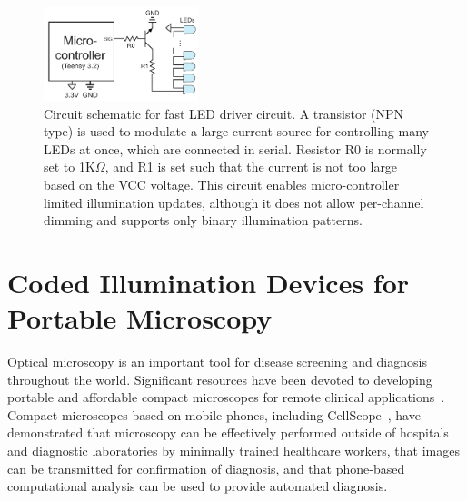 \begin{figure}
    \centering
    \includegraphics[width=0.4\textwidth]{figures/fig_fabrication_fast_circuit.pdf}
    \caption{Circuit schematic for fast LED driver circuit. A transistor (NPN type) is used to modulate a large current source for controlling many LEDs at once, which are connected in serial. Resistor R0 is normally set to 1K$\Omega$, and R1 is set such that the current is not too large based on the VCC voltage. This circuit enables micro-controller limited illumination updates, although it does not allow per-channel dimming and supports only binary illumination patterns.}\label{fig:fabrication_highthroughput_circuit}
\end{figure}

\clearpage

\section{Coded Illumination Devices for Portable Microscopy}
Optical microscopy is an important tool for disease screening and diagnosis throughout the world. Significant resources have been devoted to developing portable and affordable compact microscopes for remote clinical applications~\cite{Zhu2011, switz2014low, smith2011cell, maamari2013mobile,C4LC00010B,Vashist2014, steenblik2005lenses, cybulski2014foldscope, boppart2014point, Greenbaum17122014, mudanyali2010compact, tseng2010lensfree}.
Compact microscopes based on mobile phones, including CellScope~\cite{breslauer2009mobile, skandarajah2014quantitative}, have demonstrated that microscopy can be effectively performed outside of hospitals and diagnostic laboratories by minimally trained healthcare workers, that images can be transmitted for confirmation of diagnosis, and that phone-based computational analysis can be used to provide automated diagnosis.

